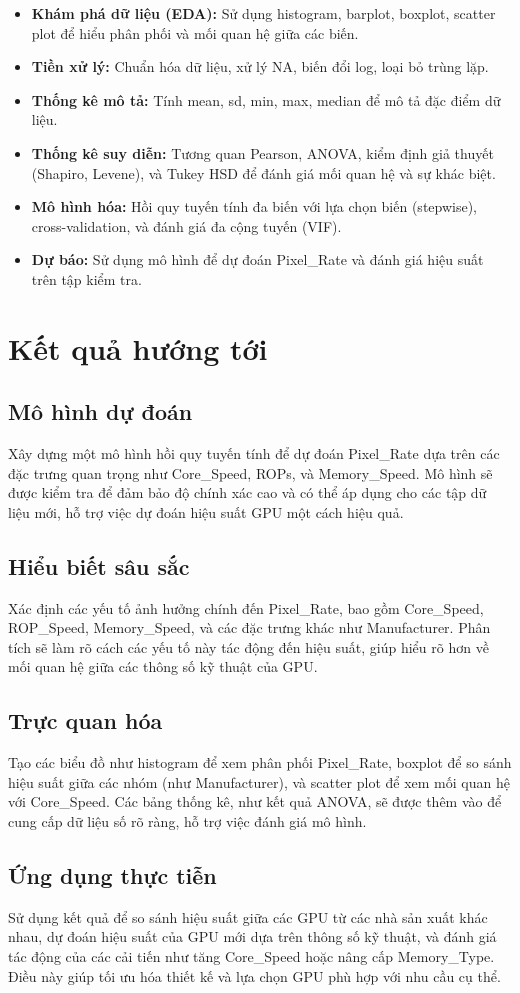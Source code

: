 \begin{itemize}
    \item \textbf{Khám phá dữ liệu (EDA):} Sử dụng histogram, barplot, boxplot, scatter plot để hiểu phân phối và mối quan hệ giữa các biến.
    \item \textbf{Tiền xử lý:} Chuẩn hóa dữ liệu, xử lý NA, biến đổi log, loại bỏ trùng lặp.
    \item \textbf{Thống kê mô tả:} Tính mean, sd, min, max, median để mô tả đặc điểm dữ liệu.
    \item \textbf{Thống kê suy diễn:} Tương quan Pearson, ANOVA, kiểm định giả thuyết (Shapiro, Levene), và Tukey HSD để đánh giá mối quan hệ và sự khác biệt.
    \item \textbf{Mô hình hóa:} Hồi quy tuyến tính đa biến với lựa chọn biến (stepwise), cross-validation, và đánh giá đa cộng tuyến (VIF).
    \item \textbf{Dự báo:} Sử dụng mô hình để dự đoán Pixel\_Rate và đánh giá hiệu suất trên tập kiểm tra.
\end{itemize}

\section{Kết quả hướng tới}

\subsection{Mô hình dự đoán}
Xây dựng một mô hình hồi quy tuyến tính để dự đoán Pixel\_Rate dựa trên các đặc trưng quan trọng như Core\_Speed, ROPs, và Memory\_Speed. Mô hình sẽ được kiểm tra để đảm bảo độ chính xác cao và có thể áp dụng cho các tập dữ liệu mới, hỗ trợ việc dự đoán hiệu suất GPU một cách hiệu quả.

\subsection{Hiểu biết sâu sắc}
Xác định các yếu tố ảnh hưởng chính đến Pixel\_Rate, bao gồm Core\_Speed, ROP\_Speed, Memory\_Speed, và các đặc trưng khác như Manufacturer. Phân tích sẽ làm rõ cách các yếu tố này tác động đến hiệu suất, giúp hiểu rõ hơn về mối quan hệ giữa các thông số kỹ thuật của GPU.

\subsection{Trực quan hóa}
Tạo các biểu đồ như histogram để xem phân phối Pixel\_Rate, boxplot để so sánh hiệu suất giữa các nhóm (như Manufacturer), và scatter plot để xem mối quan hệ với Core\_Speed. Các bảng thống kê, như kết quả ANOVA, sẽ được thêm vào để cung cấp dữ liệu số rõ ràng, hỗ trợ việc đánh giá mô hình.

\subsection{Ứng dụng thực tiễn}
Sử dụng kết quả để so sánh hiệu suất giữa các GPU từ các nhà sản xuất khác nhau, dự đoán hiệu suất của GPU mới dựa trên thông số kỹ thuật, và đánh giá tác động của các cải tiến như tăng Core\_Speed hoặc nâng cấp Memory\_Type. Điều này giúp tối ưu hóa thiết kế và lựa chọn GPU phù hợp với nhu cầu cụ thể.